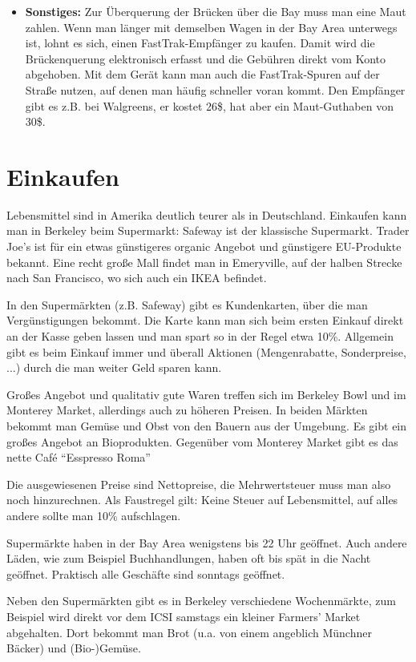 \documentclass[a4paper]{scrreprt}
\begin{document}
\begin{itemize}
	\item \textbf{Sonstiges:} Zur Überquerung der Brücken über die Bay muss man eine Maut zahlen. Wenn man länger mit demselben Wagen in der Bay Area unterwegs ist, lohnt es sich, einen FastTrak-Empfänger zu kaufen. Damit wird die Brückenquerung elektronisch erfasst und die Gebühren direkt vom Konto abgehoben. Mit dem Gerät kann man auch die FastTrak-Spuren auf der Straße nutzen, auf denen man häufig schneller voran kommt. Den Empfänger gibt es z.B. bei Walgreens, er kostet 26\$, hat aber ein Maut-Guthaben von 30\$.

\end{itemize}

\section{Einkaufen}

Lebensmittel sind in Amerika deutlich teurer als in
Deutschland. Einkaufen kann man in Berkeley beim Supermarkt: Safeway
ist der klassische Supermarkt. Trader Joe's ist für ein etwas
günstigeres organic Angebot und günstigere EU-Produkte bekannt. Eine
recht große Mall findet man in Emeryville, auf der halben Strecke nach
San Francisco, wo sich auch ein IKEA befindet. 

In den Supermärkten (z.B. Safeway) gibt es Kundenkarten, über die man
Vergünstigungen bekommt. Die Karte kann man sich beim ersten Einkauf
direkt an der Kasse geben lassen und man spart so in der Regel etwa
10\%. Allgemein gibt es beim Einkauf immer und überall Aktionen
(Mengenrabatte, Sonderpreise, ...) durch die man weiter Geld sparen
kann. 

Großes Angebot und qualitativ gute Waren treffen sich im Berkeley Bowl
und im Monterey Market, allerdings auch zu höheren Preisen. In beiden
Märkten bekommt man Gemüse und Obst von den Bauern aus der
Umgebung. Es gibt ein großes Angebot an Bioprodukten. Gegenüber vom
Monterey Market gibt es das nette Café ``Esspresso Roma''

Die ausgewiesenen Preise sind Nettopreise, die Mehrwertsteuer muss man
also noch hinzurechnen. Als Faustregel gilt: Keine Steuer auf
Lebensmittel, auf alles andere sollte man 10\% aufschlagen.

Supermärkte haben in der Bay Area wenigstens bis 22 Uhr geöffnet. Auch
andere Läden, wie zum Beispiel Buchhandlungen, haben oft bis spät in
die Nacht geöffnet. Praktisch alle Geschäfte sind sonntags geöffnet.

Neben den Supermärkten gibt es in Berkeley verschiedene Wochenmärkte,
zum Beispiel wird direkt vor dem ICSI samstags ein kleiner Farmers'
Market abgehalten. Dort bekommt man Brot (u.a. von einem angeblich
Münchner Bäcker) und (Bio-)Gemüse. %
\end{document}
